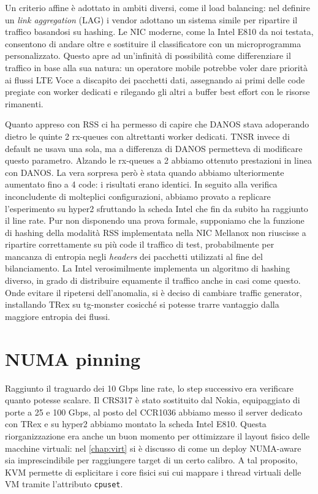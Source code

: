 Un criterio affine è adottato in ambiti diversi, come il load balancing: nel definire un \textit{link aggregation} (LAG) i vendor adottano un sistema simile per ripartire il traffico basandosi su hashing. Le NIC moderne, come la Intel E810 da noi testata, consentono di andare oltre e sostituire il classificatore con un microprogramma personalizzato. Questo apre ad un'infinità di possibilità come differenziare il traffico in base alla sua natura: un operatore mobile potrebbe voler dare priorità ai flussi LTE Voce a discapito dei pacchetti dati, assegnando ai primi delle code pregiate con worker dedicati e rilegando gli altri a buffer best effort con le risorse rimanenti.

Quanto appreso con RSS ci ha permesso di capire che DANOS stava adoperando dietro le quinte 2 rx-queues con altrettanti worker dedicati. TNSR invece di default ne usava una sola, ma a differenza di DANOS permetteva di modificare questo parametro. Alzando le rx-queues a 2 abbiamo ottenuto prestazioni in linea con DANOS. La vera sorpresa però è stata quando abbiamo ulteriormente aumentato fino a 4 code: i risultati erano identici. In seguito alla verifica inconcludente di molteplici configurazioni, abbiamo provato a replicare l'esperimento su hyper2 sfruttando la scheda Intel che fin da subito ha raggiunto il line rate.
Pur non disponendo una prova formale, supponiamo che la funzione di hashing della modalità RSS implementata nella NIC Mellanox non riuscisse a ripartire correttamente su più code il traffico di test, probabilmente per mancanza di entropia negli \textit{headers} dei pacchetti utilizzati al fine del bilanciamento.
La Intel verosimilmente implementa un algoritmo di hashing diverso, in grado di distribuire equamente il traffico anche in casi come questo. Onde evitare il ripetersi dell'anomalia, si è deciso di cambiare traffic generator, installando TRex su \mbox{tg-monster} cosicché si potesse trarre vantaggio dalla maggiore entropia dei flussi.

\section{NUMA pinning} %

Raggiunto il traguardo dei 10 Gbps line rate, lo step successivo era verificare quanto potesse scalare. Il CRS317 è stato sostituito dal Nokia, equipaggiato di porte a 25 e 100 Gbps, al posto del CCR1036 abbiamo messo il server dedicato con TRex e su hyper2 abbiamo montato la scheda Intel E810. Questa riorganizzazione era anche un buon momento per ottimizzare il layout fisico delle macchine virtuali: nel \cref{chap:virt} si è discusso di come un deploy NUMA-aware sia imprescindibile per raggiungere target di un certo calibro. A tal proposito, KVM permette di esplicitare i core fisici sui cui mappare i thread virtuali delle VM tramite l'attributo \verb|cpuset|.

